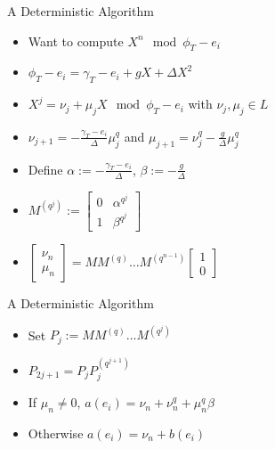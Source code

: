 \documentclass{beamer}
\begin{document}
\begin{frame}{A Deterministic Algorithm}
\begin{itemize}
    \item Want to compute $X^n \mod \phi_{T} - e_i$
    \item $\phi_T - e_i = \gamma_T - e_i + gX + \Delta X^2$
    \item $X^j = \nu_j + \mu_j X \mod \phi_{T} - e_i$ with $\nu_j, \mu_j \in L$
    \item $\nu_{j+1} = -\frac{\gamma_T - e_i}{\Delta}\mu_{j}^q$ and $\mu_{j + 1} = \nu_j^q - \frac{g}{\Delta} \mu_j^q$
    
    \item Define $\alpha := -\frac{\gamma_T - e_i}{\Delta}$, $\beta := - \frac{g}{\Delta}$
    
    \item $M^{(q^j)} := \begin{bmatrix} 0 & \alpha^{q^j} \\ 1 & \beta^{q^j} \end{bmatrix}$
    
    \item $\begin{bmatrix} \nu_{n} \\ \mu_n  \end{bmatrix} = M M^{(q)} \ldots M^{(q^{n-1})}  \begin{bmatrix} 1 \\ 0  \end{bmatrix}$
    
    
    
\end{itemize}
    
\end{frame}


\begin{frame}{A Deterministic Algorithm}
\begin{itemize}
    \item Set $ P_j := M M^{(q)} \ldots M^{(q^j)}$
    \item $P_{2j + 1} = P_{j} P_{j}^{(q^{j+1})}$
    \item If $\mu_n \neq 0$, $a(e_i) = \nu_n + \nu_n^q + \mu_n^q \beta$
    \item Otherwise $a(e_i) = \nu_n + b(e_i)$
\end{itemize}
    
\end{frame}
\end{document}
